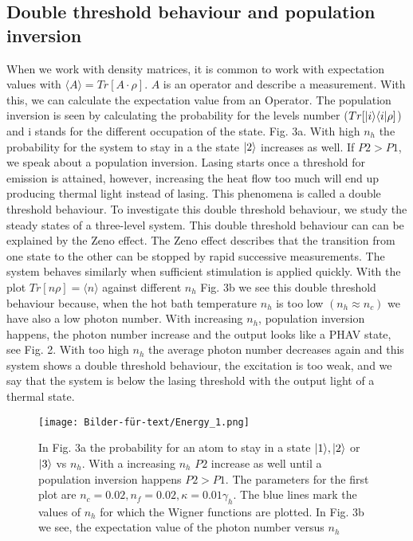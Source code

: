 \documentclass[12pt,a4paper]{article}
\DeclarePairedDelimiter\bra{\langle}{\rvert}
\DeclarePairedDelimiter\ket{\lvert}{\rangle}
\begin{document}


\newpage
\subsection{Double threshold behaviour and population inversion}
 When we work with density matrices, it is common to work with expectation values with $\langle A \rangle=Tr[A\cdot\rho]$.
 $A$ is an operator and describe a measurement.
With this, we can calculate the expectation value from an Operator. 
The population inversion is seen by calculating the probability for the levels number ($Tr[\ket{i}\bra{i} \rho]$) and i stands for the different occupation of the state. Fig. 3a.  With high $n_h$ the probability for the system to stay in a the state $\ket{2}$ increases as well. If $P2>P1$, we speak about a population inversion.  
Lasing starts once a threshold for emission is attained, however, increasing the heat flow too much will end up producing  thermal light instead of lasing. This phenomena is called a double threshold behaviour.\cite{Li2017}
To investigate this double threshold behaviour, we study the steady states of a three-level system.
This double threshold behaviour can can be explained by the Zeno effect. 
The Zeno effect describes that the transition from one state to the other can be stopped by rapid successive measurements. 
The system behaves similarly when sufficient stimulation is applied quickly. 
With the plot  $Tr[n\rho] =\langle n\rangle$ against different $n_h$ Fig. 3b we see this double threshold behaviour because, when the hot bath temperature $n_h$ is too low $(n_h \approx n_c)$ we have also a  low photon number. With increasing $n_h$, population inversion happens, the photon number increase and the output looks like a PHAV state,  see  Fig. 2. With too high $n_h$ the average photon number decreases again and this system shows a double threshold behaviour, the excitation is too weak, and we say that the system is below the lasing threshold with the output light of a thermal state.
\begin{figure}[h!]
\hspace{-1cm}
\texttt{[image: Bilder-für-text/Energy\_1.png]}
\caption{In Fig. 3a the probability for an atom to stay in a state $\ket{1}, \ket{2}$ or $\ket{3}$ vs $n_h$. With a increasing $n_h$ $P2$ increase as well until a population inversion happens $P2>P1$. The parameters for the first plot are $n_c=0.02 ,n_f=0.02,\kappa=0.01\gamma_h $. The blue lines mark the values of $ n_h$ for which the Wigner functions are plotted. In Fig. 3b we see, the expectation value of the photon number versus $n_h$ }
\end{figure}
\end{document}
